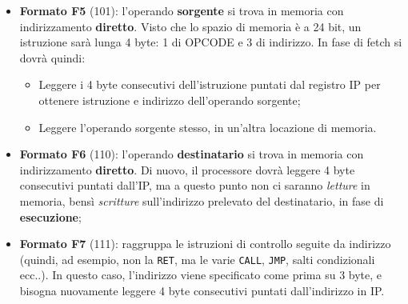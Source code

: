 \documentclass[a4paper,11pt]{article}
\begin{document}
\begin{itemize}
\item \textbf{Formato F5} (101): l'operando \textbf{sorgente} si trova in memoria con indirizzamento \textbf{diretto}.
	Visto che lo spazio di memoria è a 24 bit, un istruzione sarà lunga 4 byte: 1 di OPCODE e 3 di indirizzo.
	In fase di fetch si dovrà quindi:
	\begin{itemize}
		\item Leggere i 4 byte consecutivi dell'istruzione puntati dal registro IP per ottenere istruzione e indirizzo dell'operando sorgente;
		\item Leggere l'operando sorgente stesso, in un'altra locazione di memoria.
	\end{itemize}
\item \textbf{Formato F6} (110): l'operando \textbf{destinatario} si trova in memoria con indirizzamento \textbf{diretto}. Di nuovo, il processore dovrà leggere 4 byte consecutivi puntati dall'IP, ma a questo punto non ci saranno \textit{letture} in memoria, bensì \textit{scritture} sull'indirizzo prelevato del destinatario, in fase di \textbf{esecuzione};
\item \textbf{Formato F7} (111): raggruppa le istruzioni di controllo seguite da indirizzo (quindi, ad esempio, non la \lstinline|RET|, ma le varie \lstinline|CALL|, \lstinline|JMP|, salti condizionali ecc..).
	In questo caso, l'indirizzo viene specificato come prima su 3 byte, e bisogna nuovamente leggere 4 byte consecutivi puntati dall'indirizzo in IP.
\end{itemize}
\end{document}
